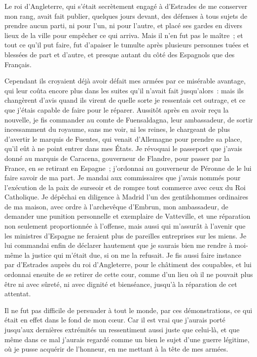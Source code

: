 \documentclass[french,twoside]{book} %
\begin{document}
Le roi d’Angleterre, qui s’était secrètement engagé à d’Estrades de me conserver mon rang, avait fait publier, quelques jours devant, des défenses à tous sujets de prendre aucun parti, ni pour l’un, ni pour l’autre, et placé ses gardes en divers lieux de la ville pour empêcher ce qui arriva. Mais il n’en fut pas le maître ; et tout ce qu’il put faire, fut d’apaiser le tumulte après plusieurs personnes tuées et blessées de part et d’autre, et presque autant du côté des Espagnols que des Français.\par
Cependant ils croyaient déjà avoir défait mes armées par ce misérable avantage, qui leur coûta encore plus dans les suites qu’il n’avait fait jusqu’alors : mais ils changèrent d’avis quand ils virent de quelle sorte je ressentais cet outrage, et ce que j’étais capable de faire pour le réparer. Aussitôt après en avoir reçu la nouvelle, je fis commander au comte de Fuensaldagna, leur ambassadeur, de sortir incessamment du royaume, sans me voir, ni les reines, le chargeant de plus d’avertir le marquis de Fuentes, qui venait d’Allemagne pour prendre sa place, qu’il eût à ne point entrer dans mes États. Je révoquai le passeport que j’avais donné au marquis de Caracena, gouverneur de Flandre, pour passer par la France, en se retirant en Espagne ; j’ordonnai au gouverneur de Péronne de le lui faire savoir de ma part. Je mandai aux commissaires que j’avais nommés pour l’exécution de la paix de surseoir et de rompre tout commerce avec ceux du Roi Catholique. Je dépêchai en diligence à Madrid l’un des gentilshommes ordinaires de ma maison, avec ordre à l’archevêque d’Embrun, mon ambassadeur, de demander une punition personnelle et exemplaire de Vatteville, et une réparation non seulement proportionnée à l’offense, mais aussi qui m’assurât à l’avenir que les ministres d’Espagne ne feraient plus de pareilles entreprises sur les miens. Je lui commandai enfin de déclarer hautement que je saurais bien me rendre à moi-même la justice qui m’était due, si on me la refusait. Je fis aussi faire instance par d’Estrades auprès du roi d’Angleterre, pour le châtiment des coupables, et lui ordonnai ensuite de se retirer de cette cour, comme d’un lieu où il ne pouvait plus être ni avec sûreté, ni avec dignité et bienséance, jusqu’à la réparation de cet attentat.\par
Il ne fut pas difficile de persuader à tout le monde, par ces démonstrations, ce qui était en effet dans le fond de mon cœur. Car il est vrai que j’aurais porté jusqu’aux dernières extrémités un ressentiment aussi juste que celui-là, et que même dans ce mal j’aurais regardé comme un bien le sujet d’une guerre légitime, où je pusse acquérir de l’honneur, en me mettant à la tête de mes armées.\par
\end{document}
